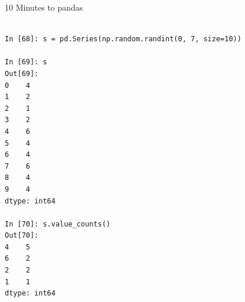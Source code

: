 \documentclass{beamer}
\begin{document}
%
%
%
%
%
%
%
%
%
%
%
%
%
%
%
%
%


%
%
%
%








\begin{frame}[t,fragile]{10 Minutes to pandas}


	\scriptsize
\begin{verbatim}

In [68]: s = pd.Series(np.random.randint(0, 7, size=10))

In [69]: s
Out[69]: 
0    4
1    2
2    1
3    2
4    6
5    4
6    4
7    6
8    4
9    4
dtype: int64

In [70]: s.value_counts()
Out[70]: 
4    5
6    2
2    2
1    1
dtype: int64


\end{verbatim}


\end{frame}
\end{document}
